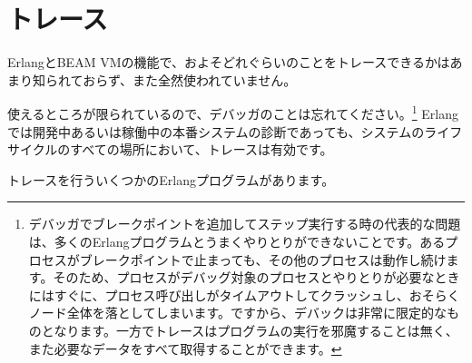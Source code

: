\chapter{トレース}
\label{chap:tracing}

ErlangとBEAM VMの機能で、およそどれぐらいのことをトレースできるかはあまり知られておらず、また全然使われていません。

使えるところが限られているので、デバッガのことは忘れてください。\footnote{デバッガでブレークポイントを追加してステップ実行する時の代表的な問題は、多くのErlangプログラムとうまくやりとりができないことです。あるプロセスがブレークポイントで止まっても、その他のプロセスは動作し続けます。そのため、プロセスがデバッグ対象のプロセスとやりとりが必要なときにはすぐに、プロセス呼び出しがタイムアウトしてクラッシュし、おそらくノード全体を落としてしまいます。ですから、デバックは非常に限定的なものとなります。一方でトレースはプログラムの実行を邪魔することは無く、また必要なデータをすべて取得することができます。} Erlangでは開発中あるいは稼働中の本番システムの診断であっても、システムのライフサイクルのすべての場所において、トレースは有効です。

トレースを行ういくつかのErlangプログラムがあります。


